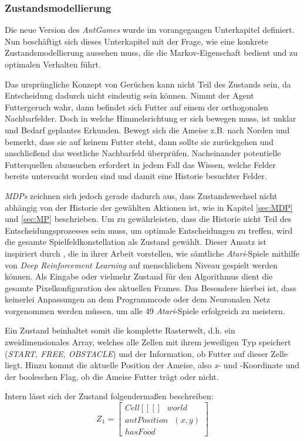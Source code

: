 \subsubsection{Zustandsmodellierung}
Die neue Version des \textit{AntGames} wurde im vorangegangen Unterkapitel definiert. Nun beschäftigt sich dieses Unterkapitel mit der Frage, wie eine konkrete Zustandsmodellierung aussehen muss, die die Markov-Eigenschaft bedient und zu optimalen Verhalten führt.
\par 
Das ursprüngliche Konzept von \glqq Gerüchen\grqq{} kann nicht Teil des Zustands sein, da Entscheidung dadurch nicht eindeutig sein können. Nimmt der Agent Futtergeruch wahr, dann befindet sich Futter auf einem der orthogonalen Nachbarfelder. Doch in welche Himmelsrichtung er sich bewegen muss, ist unklar und Bedarf geplantes Erkunden. Bewegt sich die Ameise z.B. nach Norden und bemerkt, dass sie auf keinem Futter steht, dann sollte sie zurückgehen und anschließend das westliche Nachbarfeld überprüfen. Nacheinander potentielle Futterquellen abzusuchen erfordert in jedem Fall das Wissen, welche Felder bereits untersucht worden sind und damit eine Historie besuchter Felder.
\par 
\textit{MDPs} zeichnen sich jedoch gerade dadurch aus, dass Zustandswechsel nicht abhängig von der Historie der gewählten Aktionen ist, wie in Kapitel \ref{sec:MDP} und \ref{sec:MP} beschrieben. Um zu gewährleisten, dass die Historie nicht Teil des Entscheidungsprozesses sein muss, um optimale Entscheidungen zu treffen, wird die gesamte Spielfeldkonstellation als Zustand gewählt. Dieser Ansatz ist inspiriert durch \cite{dqn}, die in ihrer Arbeit vorstellen, wie sämtliche \textit{Atari}-Spiele mithilfe von \textit{Deep Reinforcement Learning} auf menschlichem Niveau gespielt werden können. Als Eingabe oder vielmehr Zustand für den Algorithmus dient die gesamte Pixelkonfiguration des aktuellen Frames. Das Besondere hierbei ist, dass keinerlei Anpassungen an dem Programmcode oder dem Neuronalen Netz vorgenommen werden müssen, um alle 49 \textit{Atari}-Spiele erfolgreich zu meistern.
\par 
Ein Zustand beinhaltet somit die komplette Rasterwelt, d.h. ein zweidimensionales Array, welches alle Zellen mit ihrem jeweiligen Typ speichert (\textit{START, FREE, OBSTACLE}) und der Information, ob Futter auf dieser Zelle liegt. Hinzu kommt die aktuelle Position der Ameise, also \textit{x}- und \textit{}-Koordinate und der booleschen Flag, ob die Ameise Futter trägt oder nicht.
\par 
Intern lässt sich der Zustand folgendermaßen beschreiben:
\begin{equation}
Z_{1} =  \begin{bmatrix} Cell[][]\text{ }world\\
                         antPosition\text{ }(x,y) \\
                        hasFood  \end{bmatrix}
\end{equation}


